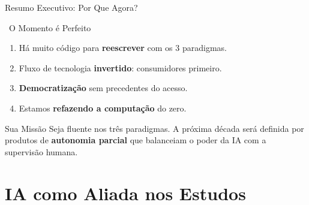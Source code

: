 \documentclass[aspectratio=169,12pt]{beamer}
\begin{document}
\begin{frame}{Resumo Executivo: Por Que Agora?}
    \begin{block}{\faRocket\, O Momento é Perfeito}
        \begin{enumerate}
            \item Há muito código para \textbf{reescrever} com os 3 paradigmas.
            \item Fluxo de tecnologia \textbf{invertido}: consumidores primeiro.
            \item \textbf{Democratização} sem precedentes do acesso.
            \item Estamos \textbf{refazendo a computação} do zero.
        \end{enumerate}
    \end{block}
    
    \begin{alertblock}{Sua Missão}
        Seja fluente nos três paradigmas. A próxima década será definida por produtos de \textbf{autonomia parcial} que balanceiam o poder da IA com a supervisão humana.
    \end{alertblock}
\end{frame}

\section{IA como Aliada nos Estudos}
\end{document}
